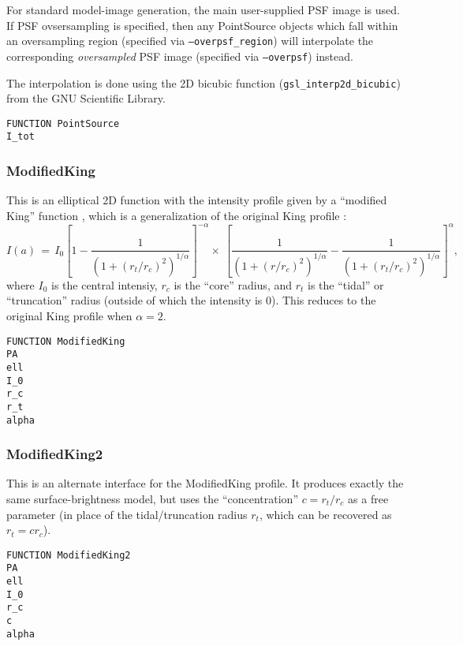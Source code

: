 \documentclass[10pt,a4paper,article]{memoir}
\begin{document}
For standard model-image generation, the main user-supplied PSF image is
used. If PSF ovsersampling is specified, then any PointSource objects
which fall within an oversampling region (specified via
\texttt{--overpsf\_region}) will interpolate the corresponding
\textit{oversampled} PSF image (specified via \texttt{--overpsf}) instead.

The interpolation is done using the 2D bicubic function
(\texttt{gsl\_interp2d\_bicubic}) from the GNU Scientific Library.

\begin{verbatim}
FUNCTION PointSource
I_tot
\end{verbatim}


\subsubsection{ModifiedKing}

This is an elliptical 2D function with the intensity profile given by a 
``modified King'' function \citep{elson99,peng10}, which is a generalization
of the original King profile \citep{king62}:
\begin{equation}
I(a) \, = \, I_{0} \left[1 - \frac{1}{(1 + (r_{t}/r_{c})^{2})^{1/\alpha}} \right]^{-\alpha}
  \times \: \left[ \frac{1}{(1 + (r/r_{c})^{2})^{1/\alpha}} - 
  \frac{1}{(1 + (r_{t}/r_{c})^{2})^{1/\alpha}} \right]^{\alpha},
\end{equation}
where $I_{0}$ is the central intensiy, $r_{c}$ is the ``core'' radius,
and $r_{t}$ is the ``tidal'' or ``truncation'' radius (outside of which
the intensity is 0).
This reduces to the original King profile when $\alpha = 2$.

\begin{verbatim}
FUNCTION ModifiedKing
PA
ell
I_0
r_c
r_t
alpha
\end{verbatim}


\subsubsection{ModifiedKing2}

This is an alternate interface for the ModifiedKing profile. It produces
exactly the same surface-brightness model, but uses the
``concentration'' $c = r_t/r_c$ as a free parameter (in place of the
tidal/truncation radius $r_{t}$, which can be recovered as $r_{t} = c r_{c}$).

\begin{verbatim}
FUNCTION ModifiedKing2
PA
ell
I_0
r_c
c
alpha
\end{verbatim}
\end{document}
